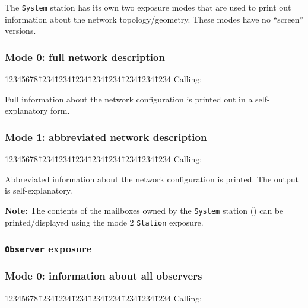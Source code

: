 The {\tt System} station has its own two exposure modes that are used to
print out information about the network topology/geometry.
These modes have no ``screen'' versions.

\subsubsection*{Mode 0: full network description}

{\tt\begin{tabbing}
12345678\=1234\=1234\=1234\=1234\=1234\=1234\=1234\=1234\kill
{\rm Calling:}
\end{tabbing}}

Full information about the network configuration
is printed out in a self-explanatory form.

\subsubsection*{Mode 1: abbreviated network description}

{\tt\begin{tabbing}
12345678\=1234\=1234\=1234\=1234\=1234\=1234\=1234\=1234\kill
{\rm Calling:}
\end{tabbing}}

Abbreviated information about the network configuration is printed.
The output is self-explanatory.

\medskip

\noindent
{\bf Note:}
The contents of the mailboxes owned by the {\tt System} station
() can be
printed/displayed using the mode 2 {\tt Station} exposure.

\subsubsection{{\tt Observer} exposure}
\label{rm_ex_se_ob}

\subsubsection*{Mode 0: information about all observers}

{\tt\begin{tabbing}
12345678\=1234\=1234\=1234\=1234\=1234\=1234\=1234\=1234\kill
{\rm Calling:}
\end{tabbing}}

